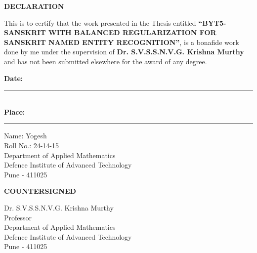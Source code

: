 
\begin{center}
{\bfseries DECLARATION}\\[5ex]
\end{center}

\noindent This is to certify that the work presented in the Thesis entitled
{\bfseries ``BYT5-SANSKRIT WITH BALANCED REGULARIZATION FOR SANSKRIT NAMED ENTITY RECOGNITION''},
is a bonafide work done by me under the supervision of
{\bfseries Dr. S.V.S.S.N.V.G. Krishna Murthy}
and has not been submitted elsewhere for the award of any degree.

\vspace{0.8in}

\noindent
\begin{minipage}[t]{0.45\textwidth}
\textbf{Date:}\rule[-3pt]{1.3in}{0.5pt}\\[1.5ex]
\textbf{Place:}\rule[-3pt]{1.3in}{0.5pt}
\end{minipage}
\hfill
\begin{minipage}[t]{0.60\textwidth}
Name: Yogesh\\
Roll No.: 24-14-15\\
Department of Applied Mathematics\\
Defence Institute of Advanced Technology\\
Pune - 411025
\end{minipage}

\vspace{1.0in}

\begin{center}
{\bfseries COUNTERSIGNED}
\end{center}

\vspace{1.0in}

\noindent
\begin{minipage}[t]{0.55\textwidth}
Dr. S.V.S.S.N.V.G. Krishna Murthy\\[1ex]
Professor\\[1ex]
Department of Applied Mathematics\\[1ex]
Defence Institute of Advanced Technology\\[1ex]
Pune - 411025
\end{minipage}
\hfill
\begin{minipage}[t]{0.48\textwidth}
\end{minipage}
